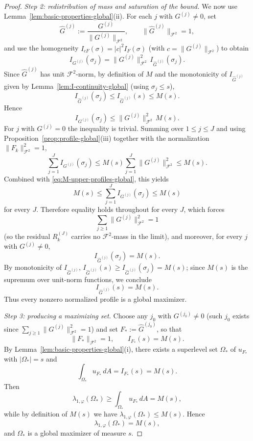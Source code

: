 \documentclass[a4paper,11pt,reqno]{amsart}
\numberwithin{equation}{section}
\theoremstyle{plain} %
\theoremstyle{definition} %
\theoremstyle{remark}
\begin{document}
\begin{proof}
\medskip
\noindent\emph{Step 2: redistribution of mass and saturation of the bound.}
We now use Lemma~\ref{lem:basic-properties-global}(ii). For each \(j\) with
\(G^{(j)}\neq 0\), set
\[
\widehat G^{(j)}:=\frac{G^{(j)}}{\|G^{(j)}\|_{\mathcal F^2}},
\qquad
\|\widehat G^{(j)}\|_{\mathcal F^2}=1,
\]
and use the homogeneity \(I_{cF}(\sigma)=|c|^2 I_F(\sigma)\) (with
\(c=\|G^{(j)}\|_{\mathcal F^2}\)) to obtain
\[
I_{G^{(j)}}(\sigma_j)
=
\|G^{(j)}\|_{\mathcal F^2}^2
\,I_{\widehat G^{(j)}}(\sigma_j).
\]
Since \(\widehat G^{(j)}\) has unit \(\mathcal F^2\)-norm, by definition of
\(M\) and the monotonicity of \(I_{\widehat G^{(j)}}\) given by
Lemma~\ref{lem:I-continuity-global} (using \(\sigma_j\le s\)),
\[
I_{\widehat G^{(j)}}(\sigma_j)\le I_{\widehat G^{(j)}}(s)\le M(s).
\]
Hence
\[
I_{G^{(j)}}(\sigma_j)\le \|G^{(j)}\|_{\mathcal F^2}^2\, M(s).
\]
For \(j\) with \(G^{(j)}=0\) the inequality is trivial. Summing over
\(1\le j\le J\) and using Proposition~\ref{prop:profile-global}(iii)
together with the normalization \(\|F_k\|_{\mathcal F^2}^2=1\),
\[
\sum_{j=1}^J I_{G^{(j)}}(\sigma_j)
\le
M(s)\sum_{j=1}^J \|G^{(j)}\|_{\mathcal F^2}^2
\le M(s).
\]
Combined with \eqref{eq:M-upper-profiles-global}, this yields
\[
M(s)\le \sum_{j=1}^J I_{G^{(j)}}(\sigma_j)\le M(s)
\]
for every \(J\). Therefore equality holds throughout for every \(J\), which
forces
\[
\sum_{j\ge 1}\|G^{(j)}\|_{\mathcal F^2}^2=1
\]
(so the residual \(R_k^{(J)}\) carries no \(\mathcal F^2\)-mass in the
limit), and moreover, for every \(j\) with \(G^{(j)}\neq 0\),
\[
I_{\widehat G^{(j)}}(\sigma_j)=M(s).
\]
By monotonicity of \(I_{\widehat G^{(j)}}\),
\(I_{\widehat G^{(j)}}(s)\ge I_{\widehat G^{(j)}}(\sigma_j)=M(s)\); since
\(M(s)\) is the supremum over unit-norm functions, we conclude
\[
I_{\widehat G^{(j)}}(s)=M(s).
\]
Thus every nonzero normalized profile is a global maximizer.

\medskip
\noindent\emph{Step 3: producing a maximizing set.}
Choose any \(j_0\) with \(G^{(j_0)}\neq 0\) (such \(j_0\) exists since
\(\sum_{j\ge 1}\|G^{(j)}\|_{\mathcal F^2}^2=1\)) and set
\(F_*:=\widehat G^{(j_0)}\), so that
\[
\|F_*\|_{\mathcal F^2}=1,
\qquad
I_{F_*}(s)=M(s).
\]
By Lemma~\ref{lem:basic-properties-global}(i), there exists a superlevel
set \(\Omega_*\) of \(u_{F_*}\) with \(|\Omega_*|=s\) and
\[
\int_{\Omega_*}u_{F_*}\,dA=I_{F_*}(s)=M(s).
\]
Then
\[
\lambda_{1,\varphi}(\Omega_*)\ge \int_{\Omega_*}u_{F_*}\,dA=M(s),
\]
while by definition of \(M(s)\) we have
\(\lambda_{1,\varphi}(\Omega_*)\le M(s)\). Hence
\[
\lambda_{1,\varphi}(\Omega_*)=M(s),
\]
and \(\Omega_*\) is a global maximizer of measure \(s\).
\end{proof}
\end{document}
